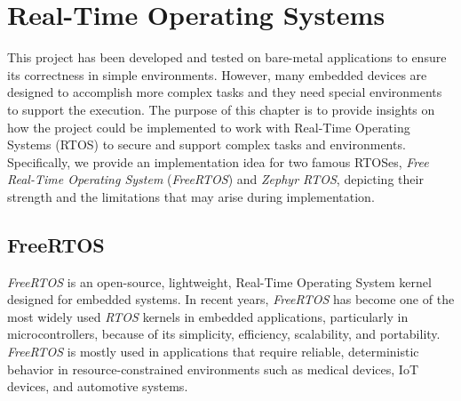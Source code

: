 \chapter{Real-Time Operating Systems}
\label{cha:rtos}

This project has been developed and tested on bare-metal applications to ensure
its correctness in simple environments. However, many embedded devices are
designed to accomplish more complex tasks and they need special environments to
support the execution. The purpose of this chapter is to provide insights on how
the project could be implemented to work with Real-Time Operating Systems (RTOS)
to secure and support complex tasks and environments. Specifically, we provide an
implementation idea for two famous RTOSes, \textit{Free Real-Time Operating
System} (\textit{FreeRTOS}) and \textit{Zephyr RTOS}, depicting their strength
and the limitations that may arise during implementation.

\section{FreeRTOS}
\label{sec:rtos_rtos}

\textit{FreeRTOS}\cite{freertos} is an open-source, lightweight, Real-Time Operating
System kernel designed for embedded systems. In recent years, \textit{FreeRTOS}
has become one of the most widely used \textit{RTOS} kernels in embedded applications,
particularly in microcontrollers, because of its simplicity, efficiency, scalability,
and portability. \textit{FreeRTOS} is mostly used in applications that require
reliable, deterministic behavior in resource-constrained environments such as medical
devices, IoT devices, and automotive systems.

